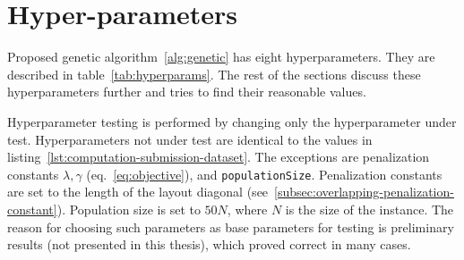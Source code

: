 \newpage


\section{Hyper-parameters}\label{sec:hyper-parameters}

Proposed genetic algorithm~\ref{alg:genetic} has eight hyperparameters.
They are described in table~\ref{tab:hyperparams}.
The rest of the sections discuss these hyperparameters further and tries to find their reasonable values.

Hyperparameter testing is performed by changing only the hyperparameter under test.
Hyperparameters not under test are identical to the values in listing~\ref{lst:computation-submission-dataset}.
The exceptions are penalization constants $\lambda, \gamma$ (eq.~\ref{eq:objective}), and \verb|populationSize|.
Penalization constants are set to the length of the layout diagonal (see~\ref{subsec:overlapping-penalization-constant}).
Population size is set to $50N$, where $N$ is the size of the instance.
The reason for choosing such parameters as base parameters for testing
is preliminary results (not presented in this thesis), which proved correct in many cases.

